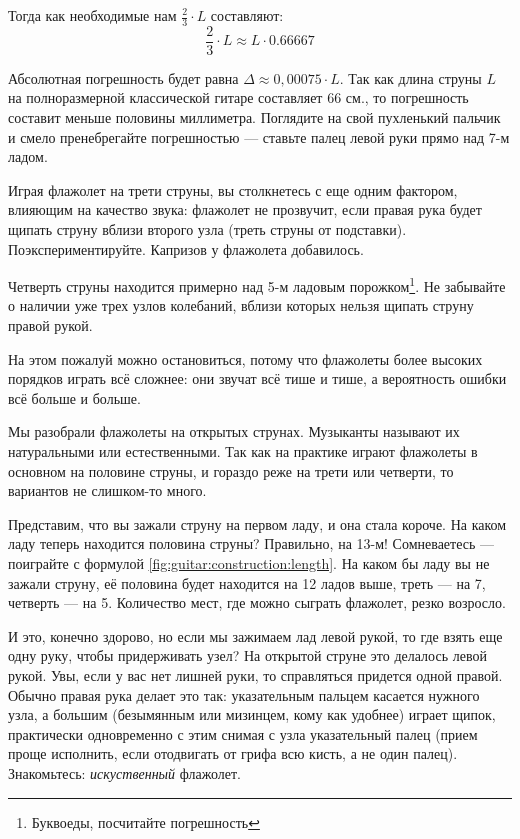 Тогда как необходимые нам $\frac{2}{3}\cdot L$ составляют:
\[
    \frac{2}{3}\cdot L \approx L\cdot 0.66667
\]

Абсолютная погрешность будет равна $\Delta \approx 0,00075 \cdot L$. Так как длина струны $L$ на полноразмерной классической гитаре составляет $66$ см., то погрешность составит меньше половины миллиметра. Поглядите на свой пухленький пальчик и смело пренебрегайте погрешностью --- ставьте палец левой руки прямо над 7-м ладом.

Играя флажолет на трети струны, вы столкнетесь с еще одним фактором, влияющим на качество звука: флажолет не прозвучит, если правая рука будет щипать струну вблизи второго узла (треть струны от подставки). Поэкспериментируйте. Капризов у флажолета добавилось.

Четверть струны находится примерно над 5-м ладовым порожком\footnote{Буквоеды, посчитайте погрешность}. Не забывайте о наличии уже трех узлов колебаний, вблизи которых нельзя щипать струну правой рукой.

На этом пожалуй можно остановиться, потому что флажолеты более высоких порядков играть всё сложнее: они звучат всё тише и тише, а вероятность ошибки всё больше и больше.

Мы разобрали флажолеты на открытых струнах. Музыканты называют их натуральными или естественными. Так как на практике играют флажолеты в основном на половине струны, и гораздо реже на трети или четверти, то вариантов не слишком-то много.

Представим, что вы зажали струну на первом ладу, и она стала короче. На каком ладу теперь находится половина струны? Правильно, на 13-м! Сомневаетесь --- поиграйте с формулой \ref{fig:guitar:construction:length}. На каком бы ладу вы не зажали струну, её половина будет находится на 12 ладов выше, треть --- на 7, четверть --- на 5. Количество мест, где можно сыграть флажолет, резко возросло.

И это, конечно здорово, но если мы зажимаем лад левой рукой, то где взять еще одну руку, чтобы придерживать узел? На открытой струне это делалось левой рукой. Увы, если у вас нет лишней руки, то справляться придется одной правой. Обычно правая рука делает это так: указательным пальцем касается нужного узла, а большим (безымянным или мизинцем, кому как удобнее) играет щипок, практически одновременно с этим снимая с узла указательный палец (прием проще исполнить, если отодвигать от грифа всю кисть, а не один палец). Знакомьтесь: \emph{искуственный} флажолет.

